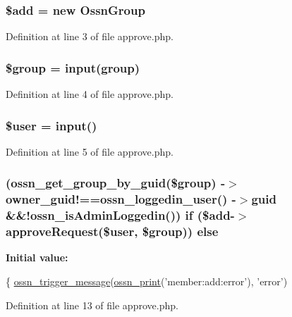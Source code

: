 \subsubsection[{\texorpdfstring{\$add}{$add}}]{\setlength{\rightskip}{0pt plus 5cm}\${\bf add} = new {\bf Ossn\+Group}}\hypertarget{approve_8php_a76aeb354fc71a358526ea9fbd7aae7a4}{}\label{approve_8php_a76aeb354fc71a358526ea9fbd7aae7a4}


Definition at line 3 of file approve.\+php.

\subsubsection[{\texorpdfstring{\$group}{$group}}]{\setlength{\rightskip}{0pt plus 5cm}\$group = {\bf input}(\textquotesingle{}group\textquotesingle{})}\hypertarget{approve_8php_ad530a85733b0ec1dc321859fd8faa0dc}{}\label{approve_8php_ad530a85733b0ec1dc321859fd8faa0dc}


Definition at line 4 of file approve.\+php.

\subsubsection[{\texorpdfstring{\$user}{$user}}]{\setlength{\rightskip}{0pt plus 5cm}\${\bf user} = {\bf input}(\textquotesingle{})}\hypertarget{approve_8php_a598ca4e71b15a1313ec95f0df1027ca5}{}\label{approve_8php_a598ca4e71b15a1313ec95f0df1027ca5}


Definition at line 5 of file approve.\+php.

\subsubsection[{\texorpdfstring{else}{else}}]{ ({\bf ossn\+\_\+get\+\_\+group\+\_\+by\+\_\+guid}(\$group) -\/$>$owner\+\_\+guid!=={\bf ossn\+\_\+loggedin\+\_\+user}() -\/$>$guid \&\&!{\bf ossn\+\_\+is\+Admin\+Loggedin}()) {\bf if} (\${\bf add}-\/$>$approve\+Request(\${\bf user}, \$group)) else}\hypertarget{approve_8php_a6a63f63af2bb7cc0d6ded8376d64ae44}{}\label{approve_8php_a6a63f63af2bb7cc0d6ded8376d64ae44}
{\bfseries Initial value\+:}
\begin{DoxyCode}
\{
    \hyperlink{ossn_8lib_8system_8php_ab3f23f23f32f50c12e7aea0ffaccaac7}{ossn\_trigger\_message}(\hyperlink{ossn_8lib_8languages_8php_a2be5d1c4b695593a9b9067b96df2150a}{ossn\_print}(\textcolor{stringliteral}{'member:add:error'}), \textcolor{stringliteral}{'error'})
\end{DoxyCode}


Definition at line 13 of file approve.\+php.

